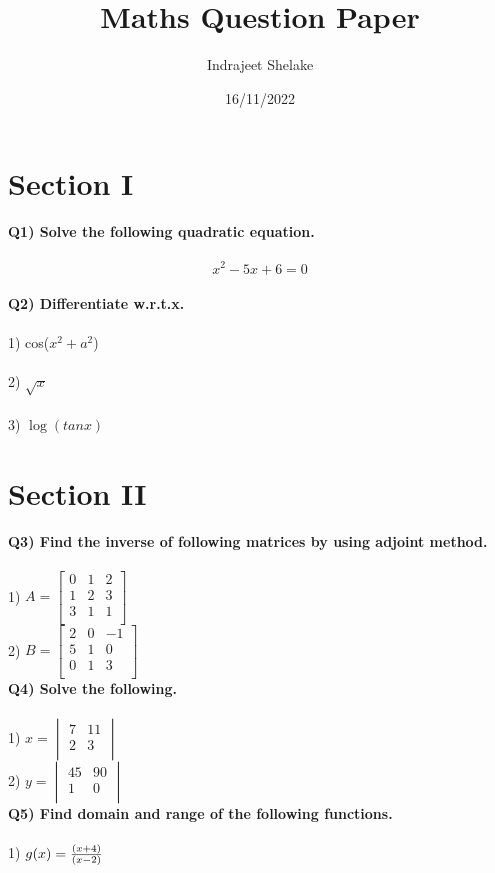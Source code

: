 \documentclass[12pt]{article}
\title{Maths Question Paper}
\author{Indrajeet Shelake}
\date{16/11/2022}
\begin{document}
\maketitle

\newpage

\section*{Section I}
\textbf{Q1) Solve the following quadratic equation.\\\\}
\begin{equation*}
x^2-5x+6 = 0 
\end{equation*}
\\
\textbf{Q2) Differentiate w.r.t.x.\\\\} 
1) cos($x^2+a^2$) \\\\
2) $\sqrt{x}$ \\\\
3) $\log{(tanx)}$ \\




\section*{Section II}
\textbf{Q3) Find the inverse of following matrices by using adjoint method.\\\\}
1) $ A = 
\begin{bmatrix}
0 & 1 & 2 \\
1 & 2 & 3 \\
3 & 1 & 1 \\
\end{bmatrix}
$ 
\\
2) $ B = 
\begin{bmatrix}
2 & 0 & -1 \\
5 & 1 & 0 \\
0 & 1 & 3 \\
\end{bmatrix}
$
\\
\textbf{Q4) Solve the following.\\\\}
1) $ x =  
\begin{vmatrix}
7 & 11 \\
2 & 3 \\
\end{vmatrix}
$
\\
2) $ y =  
\begin{vmatrix}
45 & 90 \\
1 & 0 \\
\end{vmatrix}
$
\\
\textbf{Q5) Find domain and range of the following functions.\\\\}
1) $ g(x) = 
\frac{(x+4)}{(x-2)} \\\\
$ %
\end{document}
